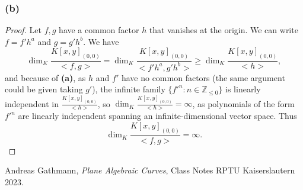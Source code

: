 \documentclass[11pt,a4paper]{article}
\begin{document}
\subsubsection*{\bf (b)} 
\begin{proof}
  Let $f, g $ have a common factor $ h $ that vanishes at the origin. We can write $ f = f' h^a $ and $ g = g' h^b $. We have
  $$
  \operatorname{dim}_K \frac{K[x,y]_{(0,0)}}{<f, g>} = \operatorname{dim}_K \frac{K[x,y]_{(0,0)}}{<f' h^a, g' h^b>} \geq \operatorname{dim}_K \frac{K[x,y]_{(0,0)}}{<h>},
  $$
  and because of {\bf (a)}, as $ h $ and $ f' $ have no common factors (the same argument could be given taking $ g'$), the infinite family $\{ f'^n: n \in \mathbb Z_{\leq 0}\}$ is linearly independent in $\frac{K[x,y]_{(0,0)}}{<h>} $, so $ \operatorname{dim}_K \frac{K[x,y]_{(0,0)}}{<h>} = \infty $, as polynomials of the form $ f'^n $ are linearly independent spanning an infinite-dimensional vector space. Thus
  $$
  \operatorname{dim}_K \frac{K[x,y]_{(0,0)}}{<f, g>} = \infty.
  $$
\end{proof}


\begin{thebibliography}{9}

  Andreas Gathmann,
  \textit{Plane Algebraic Curves},
  Class Notes RPTU Kaiserslautern 2023.
  
\end{thebibliography}
\end{document}

